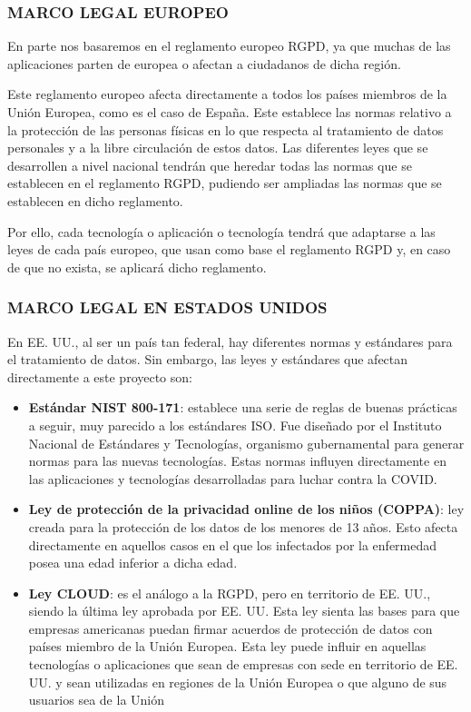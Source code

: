 \documentclass[11pt,a4paper,spanish]{article}
\begin{document}
\subsubsection{MARCO LEGAL EUROPEO}
En parte nos basaremos en el reglamento europeo RGPD, ya que muchas de las aplicaciones parten de europea o afectan a ciudadanos de dicha región.

Este reglamento europeo afecta directamente a todos los países miembros de la Unión Europea, como es el caso de España.  Este establece las normas relativo a la protección de las personas físicas en lo que respecta al tratamiento de datos personales y a la libre circulación de estos datos. Las diferentes leyes que se desarrollen a nivel nacional tendrán que heredar todas las normas que se establecen en el reglamento RGPD, pudiendo ser ampliadas las normas que se establecen en dicho reglamento.

Por ello, cada tecnología o aplicación o tecnología tendrá que adaptarse a las leyes de cada país europeo, que usan como base el reglamento RGPD y, en caso de que no exista, se aplicará dicho reglamento.
\subsubsection{MARCO LEGAL EN ESTADOS UNIDOS}
En EE. UU., al ser un país tan federal, hay diferentes normas y estándares para el tratamiento de datos. Sin embargo, las leyes y estándares que afectan directamente a este proyecto son:

\begin{itemize}
\item \textbf{Estándar NIST 800-171}: establece una serie de reglas de buenas prácticas a seguir, muy parecido a los estándares ISO. Fue diseñado por el Instituto Nacional de Estándares y Tecnologías, organismo gubernamental para generar normas para las nuevas tecnologías. Estas normas influyen directamente en las aplicaciones y tecnologías desarrolladas para luchar contra la COVID.
\item \textbf{Ley de protección de la privacidad online de los niños (COPPA)}: ley creada para la protección de los datos de los menores de 13 años. Esto afecta directamente en aquellos casos en el que los infectados por la enfermedad posea una edad inferior a dicha edad.
\item \textbf{Ley CLOUD}: es el análogo a la RGPD, pero en territorio de EE. UU., siendo la última ley aprobada por EE. UU. Esta ley sienta las bases para que empresas americanas puedan firmar acuerdos de protección de datos con países miembro de la Unión Europea. Esta ley puede influir en aquellas tecnologías o aplicaciones que sean de empresas con sede en territorio de EE. UU. y sean utilizadas en regiones de la Unión Europea o que alguno de sus usuarios sea de la Unión
\end{itemize} 
\end{document}
